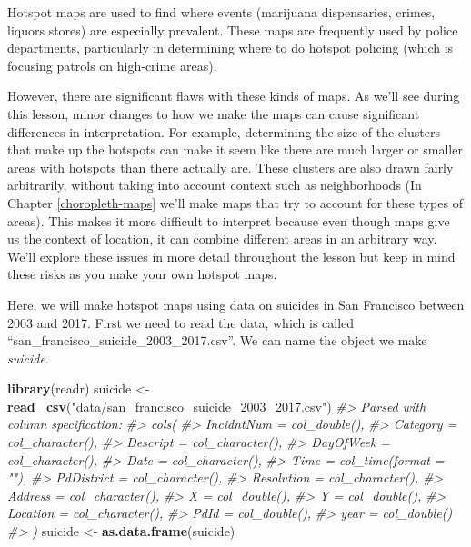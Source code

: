 \documentclass[
  12pt,
]{book}
\newenvironment{Shaded}{\begin{snugshade}}{\end{snugshade}}
\newcommand{\CommentTok}[1]{\textcolor[rgb]{0.56,0.35,0.01}{\textit{#1}}}
\newcommand{\KeywordTok}[1]{\textcolor[rgb]{0.13,0.29,0.53}{\textbf{#1}}}
\newcommand{\NormalTok}[1]{#1}
\newcommand{\StringTok}[1]{\textcolor[rgb]{0.31,0.60,0.02}{#1}}
\begin{document}
Hotspot maps are used to find where events (marijuana dispensaries, crimes, liquors stores) are especially prevalent. These maps are frequently used by police departments, particularly in determining where to do hotspot policing (which is focusing patrols on high-crime areas).

However, there are significant flaws with these kinds of maps. As we'll see during this lesson, minor changes to how we make the maps can cause significant differences in interpretation. For example, determining the size of the clusters that make up the hotspots can make it seem like there are much larger or smaller areas with hotspots than there actually are. These clusters are also drawn fairly arbitrarily, without taking into account context such as neighborhoods (In Chapter \ref{choropleth-maps} we'll make maps that try to account for these types of areas). This makes it more difficult to interpret because even though maps give us the context of location, it can combine different areas in an arbitrary way. We'll explore these issues in more detail throughout the lesson but keep in mind these risks as you make your own hotspot maps.

Here, we will make hotspot maps using data on suicides in San Francisco between 2003 and 2017. First we need to read the data, which is called ``san\_francisco\_suicide\_2003\_2017.csv''. We can name the object we make \emph{suicide}.

\begin{Shaded}
\begin{Highlighting}[]
\KeywordTok{library}\NormalTok{(readr)}
\NormalTok{suicide <{-}}\StringTok{ }\KeywordTok{read\_csv}\NormalTok{(}\StringTok{"data/san\_francisco\_suicide\_2003\_2017.csv"}\NormalTok{)}
\CommentTok{\#> Parsed with column specification:}
\CommentTok{\#> cols(}
\CommentTok{\#>   IncidntNum = col\_double(),}
\CommentTok{\#>   Category = col\_character(),}
\CommentTok{\#>   Descript = col\_character(),}
\CommentTok{\#>   DayOfWeek = col\_character(),}
\CommentTok{\#>   Date = col\_character(),}
\CommentTok{\#>   Time = col\_time(format = ""),}
\CommentTok{\#>   PdDistrict = col\_character(),}
\CommentTok{\#>   Resolution = col\_character(),}
\CommentTok{\#>   Address = col\_character(),}
\CommentTok{\#>   X = col\_double(),}
\CommentTok{\#>   Y = col\_double(),}
\CommentTok{\#>   Location = col\_character(),}
\CommentTok{\#>   PdId = col\_double(),}
\CommentTok{\#>   year = col\_double()}
\CommentTok{\#> )}
\NormalTok{suicide <{-}}\StringTok{ }\KeywordTok{as.data.frame}\NormalTok{(suicide)}
\end{Highlighting}
\end{Shaded}
\end{document}

